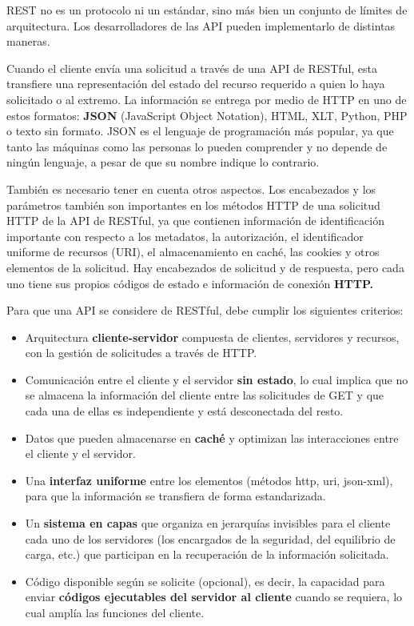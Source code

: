 \cite{redhat}REST no es un protocolo ni un estándar, sino más bien un conjunto de límites de arquitectura. Los desarrolladores de las API pueden implementarlo de distintas maneras.

Cuando el cliente envía una solicitud a través de una API de RESTful, esta transfiere una representación del estado del recurso requerido a quien lo haya solicitado o al extremo. La información se entrega por medio de HTTP en uno de estos formatos: \textbf{JSON} (JavaScript Object Notation), HTML, XLT, Python, PHP o texto sin formato. JSON es el lenguaje de programación más popular, ya que tanto las máquinas como las personas lo pueden comprender y no depende de ningún lenguaje, a pesar de que su nombre indique lo contrario. 

También es necesario tener en cuenta otros aspectos. Los encabezados y los parámetros también son importantes en los métodos HTTP de una solicitud HTTP de la API de RESTful, ya que contienen información de identificación importante con respecto a los metadatos, la autorización, el identificador uniforme de recursos (URI), el almacenamiento en caché, las cookies y otros elementos de la solicitud. Hay encabezados de solicitud y de respuesta, pero cada uno tiene sus propios códigos de estado e información de conexión \textbf{HTTP.}

Para que una API se considere de RESTful, debe cumplir los siguientes criterios:

\begin{itemize}
	\item Arquitectura \textbf{cliente-servidor} compuesta de clientes, servidores y recursos, con la gestión de solicitudes a través de HTTP.
	\item Comunicación entre el cliente y el servidor \textbf{sin estado}, lo cual implica que no se almacena la información del cliente entre las solicitudes de GET y que cada una de ellas es independiente y está desconectada del resto.
	\item Datos que pueden almacenarse en \textbf{caché} y optimizan las interacciones entre el cliente y el servidor.
	\item Una \textbf{interfaz uniforme} entre los elementos (métodos http, uri, json-xml), para que la información se transfiera de forma estandarizada.
	\item Un \textbf{sistema en capas} que organiza en jerarquías invisibles para el cliente cada uno de los servidores (los encargados de la seguridad, del equilibrio de carga, etc.) que participan en la recuperación de la información solicitada.
	\item Código disponible según se solicite (opcional), es decir, la capacidad para enviar \textbf{códigos ejecutables del servidor al cliente} cuando se requiera, lo cual amplía las funciones del cliente. 
\end{itemize}

